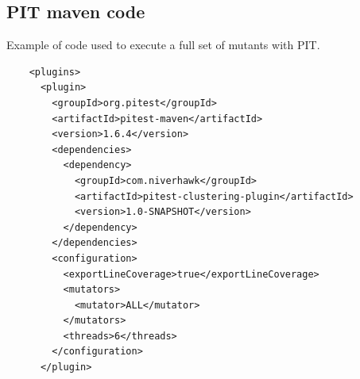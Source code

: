 \begin{appendices}
	
\chapter{PIT maven code}
\label{ap:PIT_maven_code}
Example of code used to execute a full set of mutants with PIT.
\begin{lstlisting}
    <plugins>
      <plugin>
        <groupId>org.pitest</groupId>
        <artifactId>pitest-maven</artifactId>
        <version>1.6.4</version>
        <dependencies>
          <dependency>
            <groupId>com.niverhawk</groupId>
            <artifactId>pitest-clustering-plugin</artifactId>
            <version>1.0-SNAPSHOT</version>
          </dependency>
        </dependencies>
        <configuration>
          <exportLineCoverage>true</exportLineCoverage>
          <mutators>
            <mutator>ALL</mutator>
          </mutators>
          <threads>6</threads>
        </configuration>
      </plugin>
\end{lstlisting}


\end{appendices}
